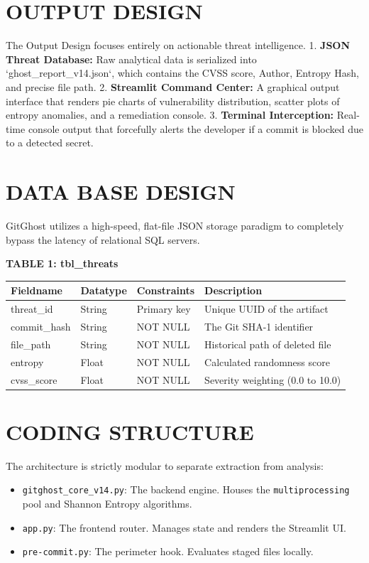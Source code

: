 \documentclass[12pt, a4paper, oneside]{report}
\begin{document}
\section{OUTPUT DESIGN}
The Output Design focuses entirely on actionable threat intelligence.
1. \textbf{JSON Threat Database:} Raw analytical data is serialized into `ghost\_report\_v14.json`, which contains the CVSS score, Author, Entropy Hash, and precise file path.
2. \textbf{Streamlit Command Center:} A graphical output interface that renders pie charts of vulnerability distribution, scatter plots of entropy anomalies, and a remediation console.
3. \textbf{Terminal Interception:} Real-time console output that forcefully alerts the developer if a commit is blocked due to a detected secret.

\section{DATA BASE DESIGN}
GitGhost utilizes a high-speed, flat-file JSON storage paradigm to completely bypass the latency of relational SQL servers.

\textbf{TABLE 1: tbl\_threats}
\begin{table}[H]
\centering
\begin{tabular}{|l|l|l|p{6cm}|}
\hline
\textbf{Fieldname} & \textbf{Datatype} & \textbf{Constraints} & \textbf{Description} \\ \hline
threat\_id & String & Primary key & Unique UUID of the artifact \\ \hline
commit\_hash & String & NOT NULL & The Git SHA-1 identifier \\ \hline
file\_path & String & NOT NULL & Historical path of deleted file \\ \hline
entropy & Float & NOT NULL & Calculated randomness score \\ \hline
cvss\_score & Float & NOT NULL & Severity weighting (0.0 to 10.0) \\ \hline
\end{tabular}
\end{table}

\section{CODING STRUCTURE}
The architecture is strictly modular to separate extraction from analysis:
\begin{itemize}
    \item \texttt{gitghost\_core\_v14.py}: The backend engine. Houses the \texttt{multiprocessing} pool and Shannon Entropy algorithms.
    \item \texttt{app.py}: The frontend router. Manages state and renders the Streamlit UI.
    \item \texttt{pre-commit.py}: The perimeter hook. Evaluates staged files locally.
\end{itemize}
\end{document}
